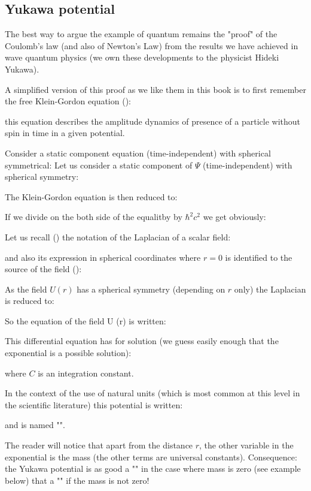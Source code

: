 	\subsection{Yukawa potential}
	The best way to argue the example of quantum remains the "proof" of the Coulomb's law (and also of Newton's Law) from the results we have achieved in wave quantum physics (we own these developments to the physicist Hideki Yukawa).

	A simplified version of this proof as we like them in this book is to first remember the free Klein-Gordon equation ():
	
	this equation describes the amplitude dynamics of presence of a particle without spin in time in a given potential.
	
	Consider a static component equation (time-independent) with spherical symmetrical:
	Let us consider a static component of $\Psi$ (time-independent) with spherical symmetry:
	
	The Klein-Gordon equation is then reduced to:
	
	If we divide on the both side of the equalitby by $\hbar^2 c^2$ we get obviously:
	
	Let us recall () the notation of the Laplacian of a scalar field:
	
	and also its expression in spherical coordinates where $r=0$ is identified to the source of the field ():
	
	As the field $U(r)$ has a spherical symmetry  (depending on $r$ only) the Laplacian is reduced to:
	
	So the equation of the field U (r) is written:
	
	This differential equation has for solution (we guess easily enough that the exponential is a possible solution):
	
	where $C$ is an integration constant.
	
	In the context of the use of natural units (which is most common at this level in the scientific literature) this potential is written:
	
	and is named "\label{yukawa potential}".

	The reader will notice that apart from the distance $r$, the other variable in the exponential is the mass (the other terms are universal constants). Consequence: the Yukawa potential is as good a "" in the case where mass is zero (see example below) that a "" if the mass is not zero!
	
